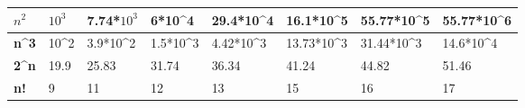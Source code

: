\documentclass[11pt,a4paper]{article}
\begin{document}
\begin{center}
\begin{table}[h]
\begin{tabular}{|l|l|l|l|l|l|l|l|}
\textbf{$n^{2}$} & $10^{3}$ & 7.74*$10^{3}$ & 6*10\textasciicircum 4                      & 29.4*10\textasciicircum 4                     & 16.1*10\textasciicircum 5                      & 55.77*10\textasciicircum 5                      & 55.77*10\textasciicircum 6                      \\ \hline
\textbf{n\textasciicircum 3} & 10\textasciicircum 2                      & 3.9*10\textasciicircum 2                    & 1.5*10\textasciicircum 3                    & 4.42*10\textasciicircum 3                     & 13.73*10\textasciicircum 3                     & 31.44*10\textasciicircum 3                      & 14.6*10\textasciicircum 4                       \\ \hline
\textbf{2\textasciicircum n} & 19.9                                      & 25.83                                       & 31.74                                       & 36.34                                         & 41.24                                          & 44.82                                           & 51.46                                           \\ \hline
\textbf{n!}                  & 9                                          &                                            11 &                                 12            &                                              13 &                                  15              &                                                16 &                        17                         \\ \hline
\end{tabular}

\end{table}
\end{center}
\end{document}
